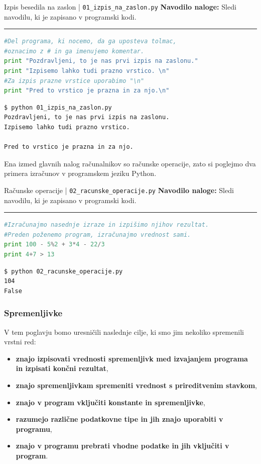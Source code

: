 \begin{examplebox}[label={prog:izpis}]{Izpis besedila na zaslon |
    \texttt{01\_izpis\_na\_zaslon.py} \cite{web:PTHardWay}}
  \textbf{Navodilo naloge:} Sledi navodilu, ki je zapisano v programski
  kodi.
\rule{\textwidth}{.4pt}
\begin{lstlisting}[language=Python]
#Del programa, ki nocemo, da ga uposteva tolmac,
#oznacimo z # in ga imenujemo komentar.
print "Pozdravljeni, to je nas prvi izpis na zaslonu."
print "Izpisemo lahko tudi prazno vrstico. \n"
#Za izpis prazne vrstice uporabimo "\n"
print "Pred to vrstico je prazna in za njo.\n"
\end{lstlisting}
\tcblower
\begin{Verbatim}[fontsize=\footnotesize]
$ python 01_izpis_na_zaslon.py
Pozdravljeni, to je nas prvi izpis na zaslonu.
Izpisemo lahko tudi prazno vrstico.

Pred to vrstico je prazna in za njo.
\end{Verbatim}
\end{examplebox}

Ena izmed glavnih nalog računalnikov so računske operacije, zato si
poglejmo dva primera izračunov v programskem jeziku Python.

\begin{examplebox}[label={prog:racunske_operacije}]{Računske operacije |
    \texttt{02\_racunske\_operacije.py} \cite{web:PTHardWay}}
  \textbf{Navodilo naloge:} Sledi navodilu, ki je zapisano v programski
  kodi.
\rule{\textwidth}{.4pt}
\begin{lstlisting}[language=Python]
#Izračunajmo nasednje izraze in izpišimo njihov rezultat.
#Preden poženemo program, izračunajmo vrednost sami.
print 100 - 5%2 + 3*4 - 22/3
print 4+7 > 13
\end{lstlisting}
\tcblower
\begin{Verbatim}[fontsize=\footnotesize]
$ python 02_racunske_operacije.py
104
False
\end{Verbatim}
\end{examplebox}

\subsubsection{Spremenljivke}
\label{sec:spremenljivke}

V tem poglavju bomo uresničili naslednje cilje, ki smo jim nekoliko
spremenili vrstni red:
\begin{itemize}
\tightlist
\item \textbf{znajo izpisovati vrednosti spremenljivk med izvajanjem programa
  in izpisati končni rezultat},
\item \textbf{znajo spremenljivkam spremeniti vrednost s prireditvenim
  stavkom},
\item \textbf{znajo v program vključiti konstante in spremenljivke},
\item \textbf{ razumejo različne podatkovne tipe in jih znajo uporabiti v
  programu},
\item \textbf{znajo v programu prebrati vhodne podatke in jih vključiti v
  program}.
\end{itemize}

